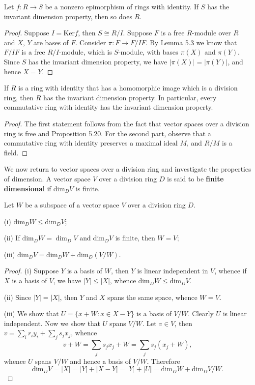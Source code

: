 \begin{proposition}
Let $f:R\to S$ be a nonzero epimorphism of rings with identity. If $S$ has the invariant dimension property, then so does $R$.
\end{proposition}
\begin{proof}
Suppose $I=\mathrm{Ker}f$, then $S\cong R/I$. Suppose $F$ is a free $R$-module over $R$ and $X$, $Y$ are bases of $F$. Consider $\pi:F\to F/IF$. By Lemma 5.3 we know that $F/IF$ is a free $R/I$-module, which is $S$-module, with bases $\pi(X)$ and $\pi(Y)$. Since $S$ has the invariant dimension property, we have $|\pi(X)|=|\pi(Y)|$, and hence $X=Y$.
\end{proof}
\begin{corollary}
If $R$ is a ring with identity that has a homomorphic image which is a division ring, then $R$ has the invariant dimension property. In particular, every commutative ring with identity has the invariant dimension property.
\end{corollary}
\begin{proof}
The first statement follows from the fact that vector spaces over a division ring is free and Proposition 5.20. For the second part, observe that a commutative ring with identity preserves a maximal ideal $M$, and $R/M$ is a field.
\end{proof}
We now return to vector spaces over a division ring and investigate the properties of dimension. A vector space $V$ over a division ring $D$ is said to be \textbf{finite dimensional} if $\mathrm{dim}_DV$ is finite.
\begin{theorem}
Let $W$ be a subspace of a vector space $V$ over a division ring $D$.\par
(i) $\mathrm{dim}_DW\le\mathrm{dim}_DV$;\par
(ii) If $\mathrm{dim}_DW=\dim_DV$ and $\mathrm{dim}_DV$ is finite, then $W=V$;\par
(iii) $\mathrm{dim}_DV=\mathrm{dim}_DW+\mathrm{dim}_D(V/W)$.
\end{theorem}
\begin{proof}
(i) Suppose $Y$ is a basis of $W$, then $Y$ is linear independent in $V$, whence if $X$ is a basis of $V$, we have $|Y|\le|X|$, whence $\mathrm{dim}_DW\le\mathrm{dim}_DV$.\par
(ii) Since $|Y|=|X|$, then $Y$ and $X$ spans the same space, whence $W=V$.\par
(iii) We show that $U=\{x+W:x\in X-Y\}$ is a basis of $V/W$. Clearly $U$ is linear independent. Now we show that $U$ spans $V/W$. Let $v\in V$, then $v=\sum_ir_iy_i+\sum_js_jx_j$, whence 
$$
v+W=\sum_j{s_jx_j}+W=\sum_j{s_j\left( x_j+W \right)},
$$
whence $U$ spans $V/W$ and hence a basis of $V/W$. Therefore 
$$
\mathrm{dim}_DV=\left| X \right|=\left| Y \right|+\left| X-Y \right|=\left| Y \right|+\left| U \right|=\mathrm{dim}_DW+\mathrm{dim}_DV/W.
$$
\end{proof}

